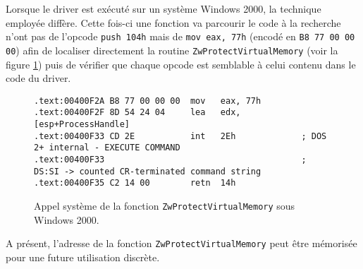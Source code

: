 \documentclass[times,11pt,fullpage]{article}
\begin{document}
Lorsque le driver est exécuté sur un système Windows 2000, la technique employée diffère. Cette fois-ci une fonction va parcourir le code à la recherche n'ont pas de l'opcode \texttt{push 104h} mais de \texttt{mov eax, 77h} (encodé en \texttt{B8 77 00 00 00}) afin de localiser directement la routine \texttt{ZwProtectVirtualMemory} (voir la figure \ref{fig:ZwProtectVirtualMemory}) puis de vérifier que chaque opcode est semblable à celui contenu dans le code du driver. 

\begin{figure}
\begin{framed}
\scriptsize
\begin{verbatim}
.text:00400F2A B8 77 00 00 00  mov   eax, 77h
.text:00400F2F 8D 54 24 04     lea   edx, [esp+ProcessHandle]
.text:00400F33 CD 2E           int   2Eh             ; DOS 2+ internal - EXECUTE COMMAND
.text:00400F33                                       ; DS:SI -> counted CR-terminated command string
.text:00400F35 C2 14 00        retn  14h
\end{verbatim}
\end{framed}
\caption{Appel système de la fonction \texttt{ZwProtectVirtualMemory} sous Windows 2000.\label{fig:ZwProtectVirtualMemory}}
\end{figure}

A présent, l'adresse de la fonction \texttt{ZwProtectVirtualMemory} peut être mémorisée pour une future utilisation discrète. 
\end{document}

